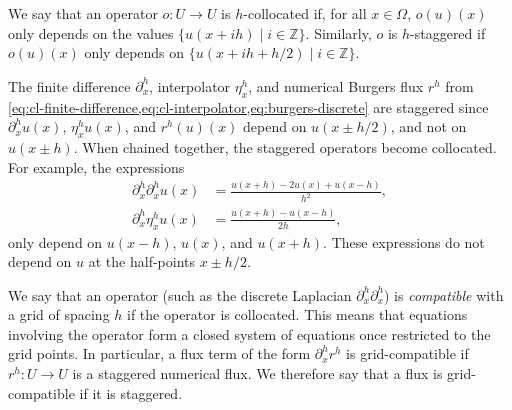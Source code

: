 \documentclass[preprint,twocolumn,5p]{elsarticle}
\begin{document}
We say that an operator $o : U \to U$ is $h$-collocated if,
for all $x \in \Omega$, $o(u)(x)$ only depends on the values
$\{u(x + i h) \mid i \in \mathbb{Z} \}$.
Similarly, $o$ is $h$-staggered if $o(u)(x)$ only depends on
$\{u(x + i h + h / 2) \mid i \in \mathbb{Z} \}$.


The finite difference $\partial^h_x$, interpolator $\eta^h_x$, and numerical Burgers flux $r^h$ from
\cref{eq:cl-finite-difference,eq:cl-interpolator,eq:burgers-discrete}
are staggered since $\partial^h_x u(x)$, $\eta^h_x u(x)$, and $r^h(u)(x)$
depend on $u(x \pm h / 2)$, and not on $u(x \pm h)$. When chained together, the
staggered operators become collocated. For example, the expressions
\begin{align}
    \partial^h_x \partial^h_x u(x)
    & = \frac{u(x + h) - 2 u(x) + u(x - h)}{h^2}, \\
    \partial^h_x \eta^h_x u(x)
    & = \frac{u(x + h) - u(x - h)}{2h},
\end{align}
only depend on $u(x - h)$, $u(x)$, and $u(x + h)$.
These expressions do not depend on $u$ at the half-points $x \pm h / 2$.


We say that an operator
(such as the discrete Laplacian $\partial^h_x \partial^h_x$)
is \emph{compatible} with a grid of spacing $h$ if the operator is collocated.
This means that equations involving the operator form a closed
system of equations once restricted to the grid points.
In particular, a flux term of the form $\partial^h_x r^h$ is grid-compatible
if $r^h : U \to U$ is a staggered numerical flux.
We therefore say that a flux is grid-compatible if it is staggered.
\end{document}
